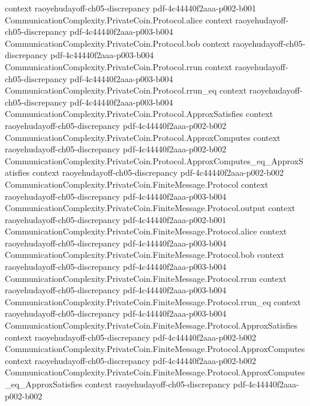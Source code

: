 \begin{lemma}
  {context}
  {raoyehudayoff-ch05-discrepancy}
  {pdf-4c44440f2aaa-p002-b001}
\proofstep
  {CommunicationComplexity.PrivateCoin.Protocol.alice}
  {context}
  {raoyehudayoff-ch05-discrepancy}
  {pdf-4c44440f2aaa-p003-b004}
\proofstep
  {CommunicationComplexity.PrivateCoin.Protocol.bob}
  {context}
  {raoyehudayoff-ch05-discrepancy}
  {pdf-4c44440f2aaa-p003-b004}
\proofstep
  {CommunicationComplexity.PrivateCoin.Protocol.rrun}
  {context}
  {raoyehudayoff-ch05-discrepancy}
  {pdf-4c44440f2aaa-p003-b004}
\proofstep
  {CommunicationComplexity.PrivateCoin.Protocol.rrun_eq}
  {context}
  {raoyehudayoff-ch05-discrepancy}
  {pdf-4c44440f2aaa-p003-b004}
\proofstep
  {CommunicationComplexity.PrivateCoin.Protocol.ApproxSatisfies}
  {context}
  {raoyehudayoff-ch05-discrepancy}
  {pdf-4c44440f2aaa-p002-b002}
\proofstep
  {CommunicationComplexity.PrivateCoin.Protocol.ApproxComputes}
  {context}
  {raoyehudayoff-ch05-discrepancy}
  {pdf-4c44440f2aaa-p002-b002}
\proofstep
  {CommunicationComplexity.PrivateCoin.Protocol.ApproxComputes_eq_ApproxSatisfies}
  {context}
  {raoyehudayoff-ch05-discrepancy}
  {pdf-4c44440f2aaa-p002-b002}
\proofstep
  {CommunicationComplexity.PrivateCoin.FiniteMessage.Protocol}
  {context}
  {raoyehudayoff-ch05-discrepancy}
  {pdf-4c44440f2aaa-p003-b004}
\proofstep
  {CommunicationComplexity.PrivateCoin.FiniteMessage.Protocol.output}
  {context}
  {raoyehudayoff-ch05-discrepancy}
  {pdf-4c44440f2aaa-p002-b001}
\proofstep
  {CommunicationComplexity.PrivateCoin.FiniteMessage.Protocol.alice}
  {context}
  {raoyehudayoff-ch05-discrepancy}
  {pdf-4c44440f2aaa-p003-b004}
\proofstep
  {CommunicationComplexity.PrivateCoin.FiniteMessage.Protocol.bob}
  {context}
  {raoyehudayoff-ch05-discrepancy}
  {pdf-4c44440f2aaa-p003-b004}
\proofstep
  {CommunicationComplexity.PrivateCoin.FiniteMessage.Protocol.rrun}
  {context}
  {raoyehudayoff-ch05-discrepancy}
  {pdf-4c44440f2aaa-p003-b004}
\proofstep
  {CommunicationComplexity.PrivateCoin.FiniteMessage.Protocol.rrun_eq}
  {context}
  {raoyehudayoff-ch05-discrepancy}
  {pdf-4c44440f2aaa-p003-b004}
\proofstep
  {CommunicationComplexity.PrivateCoin.FiniteMessage.Protocol.ApproxSatisfies}
  {context}
  {raoyehudayoff-ch05-discrepancy}
  {pdf-4c44440f2aaa-p002-b002}
\proofstep
  {CommunicationComplexity.PrivateCoin.FiniteMessage.Protocol.ApproxComputes}
  {context}
  {raoyehudayoff-ch05-discrepancy}
  {pdf-4c44440f2aaa-p002-b002}
\proofstep
  {CommunicationComplexity.PrivateCoin.FiniteMessage.Protocol.ApproxComputes_eq_ApproxSatisfies}
  {context}
  {raoyehudayoff-ch05-discrepancy}
  {pdf-4c44440f2aaa-p002-b002}
\proofstep

\end{lemma}
